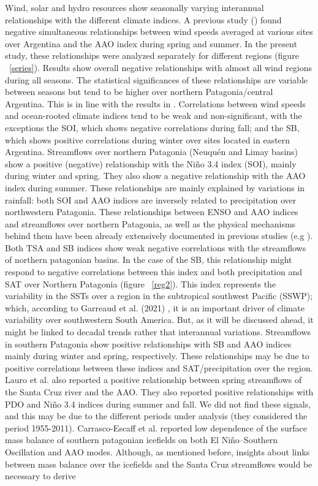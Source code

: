 \documentclass[AMA,Times1COL]{WileyNJDv5} %
\begin{document}
\begin{linenumbers}
Wind, solar and hydro resources show seasonally varying interannual relationships with the different climate indices. A previous study (\cite{bianchi2022assessing}) found negative simultaneous relationships between wind speeds averaged at various sites over Argentina and the AAO index during spring and summer. In the present study, these relationships were analyzed separately for different regions (figure ~\ref{series}). Results show overall negative relationships with almost all wind regions during all seasons. The statistical significances of these relationships are variable between seasons but tend to be higher over northern Patagonia/central Argentina. This is in line with the results in \cite{bianchi2017large}. Correlations between wind speeds and ocean-rooted climate indices tend to be weak and non-significant, with the exceptions the SOI, which shows negative correlations during fall; and the SB, which shows positive correlations during winter over sites located in eastern Argentina. Streamflows over northern Patagonia (Neuquén and Limay basins) show a positive (negative) relationship with the Niño 3.4 index (SOI), mainly during winter and spring. They also show a negative relationship with the AAO index during summer. These relationships are mainly explained by variations in rainfall: both SOI and AAO indices are inversely related to precipitation over northwestern Patagonia. These relationships between ENSO and AAO indices and streamflows over northern Patagonia, as well as the physical mechanisms behind them have been already extensively documented in previous studies (e.g \cite{gonzalez2010statistical, masiokas2006snowpack, lauro2019streamflow, camposenso}). Both TSA and SB indices show weak negative correlations with the streamflows of northern patagonian basins. In the case of the SB, this relationship might respond to negative correlations between this index and both precipitation and SAT over Northern Patagonia (figure ~\ref{reg2}). This index represents the variability in the SSTs over a region in the subtropical southwest Pacific (SSWP); which, according to Garreaud et al. (2021) \cite{garreaud2021south}, it is an important driver of climate variability over southwestern South America. But, as it will be discussed ahead, it might be linked to decadal trends rather that interannual variations. Streamflows in southern Patagonia show positive relationships with SB and AAO indices mainly during winter and spring, respectively. These relationships may be due to positive correlations between these indices and SAT/precipitation over the region. Lauro et al. \cite{lauro2019streamflow} also reported a positive relationship between spring streamflows of the Santa Cruz river and the AAO. They also reported positive relationships with PDO and Niño 3.4 indices during summer and fall. We did not find these signals, and this may be due to the different periods under analysis (they considered the period 1955-2011). Carrasco-Escaff et al. \cite{carrasco2022climatic} reported low dependence of the surface mass balance of southern patagonian icefields on both El Niño–Southern Oscillation and AAO modes. Although, as mentioned before, insights about links between mass balance over the icefields and the Santa Cruz streamflows would be necessary to derive 
\end{linenumbers}
\end{document}

